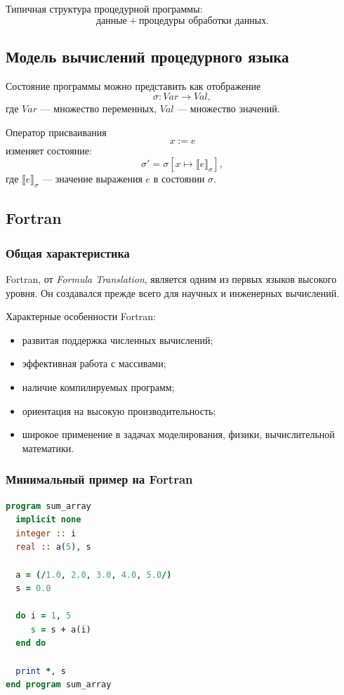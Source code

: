 \documentclass[12pt,a4paper]{article}
\begin{document}
Типичная структура процедурной программы:
$$
\text{данные} + \text{процедуры обработки данных}.
$$

\subsection{Модель вычислений процедурного языка}

Состояние программы можно представить как отображение
$$
\sigma : Var \to Val,
$$
где $Var$ --- множество переменных, $Val$ --- множество значений.

Оператор присваивания
$$
x := e
$$
изменяет состояние:
$$
\sigma' = \sigma[x \mapsto \llbracket e \rrbracket_\sigma],
$$
где $\llbracket e \rrbracket_\sigma$ --- значение выражения $e$ в состоянии $\sigma$.

\subsection{Fortran}

\subsubsection{Общая характеристика}

Fortran, от \emph{Formula Translation}, является одним из первых языков высокого уровня. Он создавался прежде всего для научных и инженерных вычислений.

Характерные особенности Fortran:
\begin{itemize}
    \item развитая поддержка численных вычислений;
    \item эффективная работа с массивами;
    \item наличие компилируемых программ;
    \item ориентация на высокую производительность;
    \item широкое применение в задачах моделирования, физики, вычислительной математики.
\end{itemize}

\subsubsection{Минимальный пример на Fortran}

\begin{lstlisting}[language=Fortran]
program sum_array
  implicit none
  integer :: i
  real :: a(5), s

  a = (/1.0, 2.0, 3.0, 4.0, 5.0/)
  s = 0.0

  do i = 1, 5
     s = s + a(i)
  end do

  print *, s
end program sum_array
\end{lstlisting}
\end{document}
